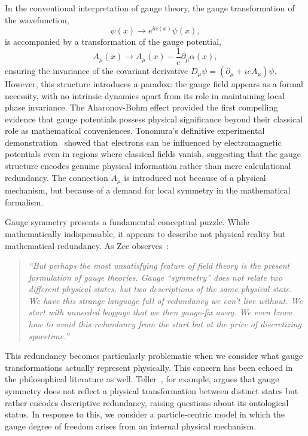 \documentclass[%
 reprint,
 amsmath,amssymb,
 aps,
]{revtex4-1}
\numberwithin{equation}{section}%
\begin{document}
In the conventional interpretation of gauge theory, the gauge transformation of the wavefunction,
\begin{equation}
\psi(x) \rightarrow e^{i\alpha(x)} \psi(x),
\label{eq:wavefunction}
\end{equation}
is accompanied by a transformation of the gauge potential, 
\begin{equation}
A_\mu(x) \rightarrow A_\mu(x) - \frac{1}{e} \partial_\mu \alpha(x),
\label{eq:gauge_potential}
\end{equation}
ensuring the invariance of the covariant derivative $D_\mu \psi = (\partial_\mu + i e A_\mu) \psi$. However, this structure introduces a paradox: the gauge field appears as a formal necessity, with no intrinsic dynamics apart from its role in maintaining local phase invariance. The Aharonov-Bohm effect provided the first compelling evidence that gauge potentials possess physical significance beyond their classical role as mathematical conveniences. Tonomura's definitive experimental demonstration~\cite{tonomura1986} showed that electrons can be influenced by electromagnetic potentials even in regions where classical fields vanish, suggesting that the gauge structure encodes genuine physical information rather than mere calculational redundancy. The connection $A_\mu$ is introduced not because of a physical mechanism, but because of a demand for local symmetry in the mathematical formalism.

Gauge symmetry presents a fundamental conceptual puzzle. While mathematically 
indispensable, it appears to describe not physical reality but mathematical 
redundancy. As Zee observes~\cite{zee2010}:
\begin{quote}
\textit{``But perhaps the most unsatisfying feature of field theory is the present formulation of gauge theories. Gauge ``symmetry'' does not relate two different physical states, but two descriptions of the same physical state. We have this strange language full of redundancy we can't live without. We start with unneeded baggage that we then gauge-fix away. We even know how to avoid this redundancy from the start but at the price of discretizing spacetime.''}
\end{quote}

This redundancy becomes particularly problematic when we consider what gauge 
transformations actually represent physically. This concern has been echoed in the philosophical literature as well. Teller~\cite{teller2000}, for example, argues that gauge symmetry does not reflect a physical transformation between distinct states but rather encodes descriptive redundancy, raising questions about its ontological status. In response to this, we consider a particle-centric model in which the gauge degree of freedom arises from an internal physical mechanism.
\end{document}
